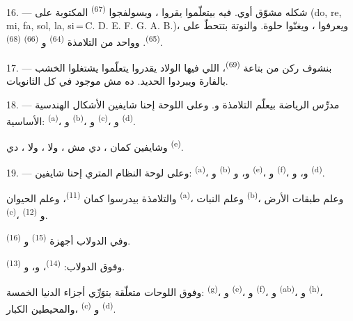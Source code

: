 16. ---  شكله مشوّق أوي. فيه بيتعلّموا يقروا
، ويسولفجوا  \textsuperscript{(67)} المكتوبة على
 (do, re, mi, fa, sol, la, si\,=\,C. D. E. F. G. A. B.)،
ويعرفوا ، ويغنّوا  حلوة. والنوتة بتتحطّ على
 \textsuperscript{(65)}. وواحد من التلامذة  \textsuperscript{(64)} و \textsuperscript{(66)}
 \textsuperscript{(68)}.

17. --- بنشوف ركن من  بتاعة 
\textsuperscript{(69)}، اللي فيها الولاد يقدروا يتعلّموا يشتغلوا الخشب بالفارة
ويبردوا الحديد. ده مش موجود في كل الثانويات.

\VUsaut{5.0mm}
\VUsaut{3.6mm}

18. --- مدرِّس الرياضة بيعلّم التلامذة 
و. وعلى اللوحة إحنا شايفين الأشكال الهندسية الأساسية:
 \textsuperscript{(a)}، و \textsuperscript{(b)}،
و \textsuperscript{(c)}، و \textsuperscript{(d)}.

وشايفين كمان ، دي مش ، ولا ، ولا
، دي  \textsuperscript{(e)}.

19. --- وعلى لوحة النظام المتري إحنا شايفين: 
\textsuperscript{(a)}، و \textsuperscript{(b)} و،
و \textsuperscript{(e)}، و \textsuperscript{(f)}،
و، و \textsuperscript{(d)}.

والتلامذة بيدرسوا كمان  \textsuperscript{(11)}، وعلم الحيوان
\textsuperscript{(a)}، وعلم النبات \textsuperscript{(b)}، وعلم طبقات الأرض
\textsuperscript{(c)}، و \textsuperscript{(12)}.

وفي الدولاب أجهزة  \textsuperscript{(15)} و
\textsuperscript{(16)}.

وفوق الدولاب:  \textsuperscript{(14)}، و،
و \textsuperscript{(13)}.

وفوق اللوحات متعلّقة  بتوَرِّي أجزاء الدنيا الخمسة:
 \textsuperscript{(g)}، و \textsuperscript{(e)}،
و \textsuperscript{(f)}، و \textsuperscript{(ab)}،
و \textsuperscript{(h)}، والمحيطين الكبار،
 \textsuperscript{(c)} و \textsuperscript{(d)}.

\VUsaut{6.0mm}
\VUfilet{22mm}
